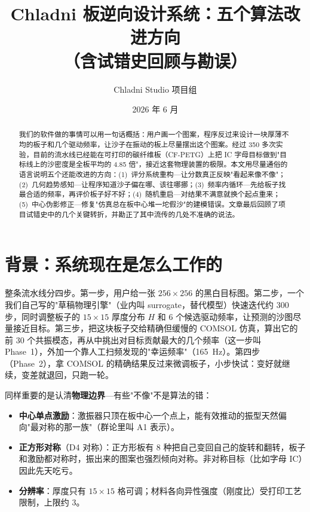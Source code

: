 \documentclass[11pt,a4paper]{article}
\title{\textbf{Chladni 板逆向设计系统：五个算法改进方向\\
\large（含试错史回顾与勘误）}}
\author{Chladni Studio 项目组}
\date{2026 年 6 月}
\begin{document}
\maketitle

\begin{abstract}
我们的软件做的事情可以用一句话概括：用户画一个图案，程序反过来设计一块厚薄不均的板子和几个驱动频率，让沙子在振动的板上尽量摆出这个图案。经过 350 多次实验，目前的流水线已经能在可打印的碳纤维板（CF-PETG）上把 IC 字母目标做到"目标线上的沙密度是全板平均的 4.85 倍"，接近这套物理装置的极限。本文用尽量通俗的语言说明五个还能改进的方向：(1)~评分系统重构---让分数真正反映"看起来像不像"；(2)~几何趋势感知---让程序知道沙子偏在哪、该往哪挪；(3)~频率内循环---先给板子找最合适的频率，再评价板子好不好；(4)~随机重启---对结果不满意就换个起点重来；(5)~中心伪影修正---修复"仿真总在板中心堆一坨假沙"的建模错误。文章最后回顾了项目试错史中的几个关键转折，并勘正了其中流传的几处不准确的说法。
\end{abstract}

\section{背景：系统现在是怎么工作的}

整条流水线分四步。第一步，用户给一张 $256\times 256$ 的黑白目标图。第二步，一个我们自己写的"草稿物理引擎"（业内叫 surrogate，替代模型）快速迭代约 300 步，同时调整板子的 $15\times 15$ 厚度分布 $H$ 和 6 个候选驱动频率，让预测的沙图尽量接近目标。第三步，把这块板子交给精确但缓慢的 COMSOL 仿真，算出它的前 30 个共振模态，再从中挑出对目标贡献最大的几个频率（这一步叫 Phase~1），外加一个靠人工扫频发现的"幸运频率"（165~Hz）。第四步（Phase~2），拿 COMSOL 的精确结果反过来微调板子，小步快试：变好就继续，变差就退回，只跑一轮。

同样重要的是认清\textbf{物理边界}---有些"不像"不是算法的错：

\begin{itemize}[leftmargin=2em]
\item \textbf{中心单点激励}：激振器只顶在板中心一个点上，能有效推动的振型天然偏向"最对称的那一族"（群论里叫 A1 表示）。
\item \textbf{正方形对称}（D4 对称）：正方形板有 8 种把自己变回自己的旋转和翻转，板子和激励都对称时，振出来的图案也强烈倾向对称。非对称目标（比如字母 IC）因此先天吃亏。
\item \textbf{分辨率}：厚度只有 $15\times 15$ 格可调；材料各向异性强度（刚度比）受打印工艺限制，上限约 3。
\end{itemize}
\end{document}
